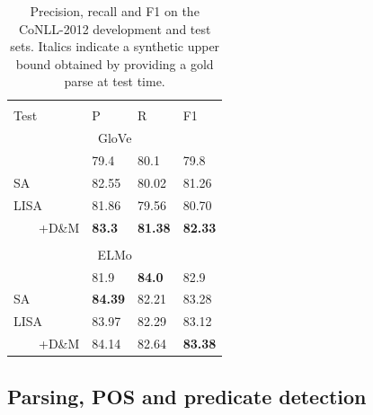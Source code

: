 \documentclass[11pt,a4paper]{article}
\begin{document}
\begin{table}
\begin{tabular}{llll}
 & & & \\
Test &  P & R & F1 \\ \hline \hline
\multicolumn{4}{c}{GloVe} \\ \hline
\citet{he2018jointly} & 79.4 & 80.1 & 79.8 \\ \hline
SA & 82.55 & 80.02 & 81.26 \\ %
LISA &  81.86 &	79.56 &	80.70 \\ %
\ \ \ \ +D\&M & {\bf 83.3} & {\bf 81.38} &	{\bf 82.33} \\ %
\hline
 & & & \\
\multicolumn{4}{c}{ELMo} \\ \hline
\citet{he2018jointly} & 81.9 & {\bf 84.0} & 82.9 \\ \hline
SA & {\bf 84.39} & 82.21 & 83.28 \\ %
LISA & 83.97 & 82.29 & 83.12 \\
\ \ \ \ +D\&M & 84.14 & 82.64 & {\bf 83.38} \\	

\end{tabular}
\caption{Precision, recall and F1 on the CoNLL-2012 development and test sets. Italics indicate a synthetic upper bound obtained by providing a gold parse at test time.\label{tab:conll12-results}}
\end{table}


\subsection{Parsing, POS and predicate detection \label{sec:parse-pos-results}}
\end{document}
